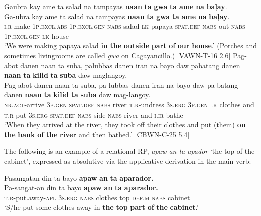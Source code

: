 \ea
Gaubra  kay  ame  ta  salad  na  tampayas  \textbf{naan} \textbf{ta}  \textbf{gwa}  \textbf{ta}  \textbf{ame}  \textbf{na}  \textbf{baļay}. \\\smallskip
 \gll Ga-ubra  kay  ame  ta  salad  na  tampayas  \textbf{naan} \textbf{ta}  \textbf{gwa}  \textbf{ta}  \textbf{ame}  \textbf{na}  \textbf{baļay}. \\
\textsc{i.r}-make  1\textsc{p.excl.abs}  1\textsc{p.excl.gen}  \textsc{nabs}  salad  \textsc{lk}  papaya  \textsc{spat.def}
\textsc{nabs}  out  \textsc{nabs}  1\textsc{p.excl.gen}  \textsc{lk}  house \\
\glt `We were making papaya salad \textbf{in} \textbf{the} \textbf{outside} \textbf{part} \textbf{of} \textbf{our} \textbf{house}.’ (Porches and sometimes livingrooms are called \textit{gwa} on Cagayancillo.) [VAWN-T-16 2.6]
\z
\ea
Pag-abot  danen  naan  ta  suba,  palubbas  danen  iran  na bayo  daw  pabatang  danen  \textbf{naan}  \textbf{ta}  \textbf{kilid}  \textbf{ta}  \textbf{suba}  daw  maglangoy. \\\smallskip
 \gll Pag-abot  danen  naan  ta  suba,  pa-lubbas  danen  iran  na bayo  daw  pa-batang  danen  \textbf{naan}  \textbf{ta}  \textbf{kilid}  \textbf{ta}  \textbf{suba}  daw  mag-langoy. \\
\textsc{nr.act}-arrive  3\textsc{p.gen}  \textsc{spat.def}  \textsc{nabs}  river  \textsc{t.r}-undress  3\textsc{s.erg}  3\textsc{p.gen}  \textsc{lk}
clothes  and  \textsc{t.r}-put  3\textsc{s.erg}  \textsc{spat.def}  \textsc{nabs}  side  \textsc{nabs}  river  and  \textsc{i.ir}-bathe \\
\glt `When they arrived at the river, they took off their clothes and put (them) \textbf{on} \textbf{the} \textbf{bank} \textbf{of} \textbf{the} \textbf{river} and then bathed.’ [CBWN-C-25 5.4]
\z

The following is an example of a relational RP, \textit{apaw an ta apador} ‘the top of the cabinet’, expressed as absolutive via the applicative derivation in the main verb:

\ea
Pasangatan  din  ta  bayo  \textbf{apaw}  \textbf{an}  \textbf{ta}  \textbf{aparador.} \\\smallskip
 \gll Pa-sangat-an  din  ta  bayo  \textbf{apaw}  \textbf{an}  \textbf{ta}  \textbf{aparador.} \\
\textsc{t.r}-put.away-\textsc{apl}  3\textsc{s.erg}  \textsc{nabs}  clothes  top  \textsc{def.m}  \textsc{nabs}  cabinet \\
\glt ‘S/he put some clothes away in \textbf{the} \textbf{top} \textbf{part} \textbf{of} \textbf{the} \textbf{cabinet}.’
\z


